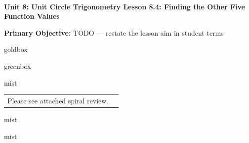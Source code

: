 \documentclass[10pt]{article}
\newcommand{\UnitNumberName}{Unit 8: Unit Circle Trigonometry \quad}
\newcommand{\LessonNumberName}{Lesson 8.4: Finding the Other Five Function Values}
\begin{document}
\begin{center}
    {\Large\bfseries \CourseName \\
    {\small\bfseries \UnitNumberName \LessonNumberName}}
\end{center}

\begin{tcolorbox}[colback=mist, colframe=royal, boxrule=0.9pt, arc=2mm,
    left=2mm, right=2mm, top=1.5mm, bottom=1.5mm]
    \textbf{Primary Objective:} TODO --- restate the lesson aim in student terms
\end{tcolorbox}

\renewcommand{\arraystretch}{1.6}
\begin{skillbox}{goldbox}
\end{skillbox}

\begin{skillbox}{greenbox}
\end{skillbox}

\begin{fixedskillbox}{mist}
    \begin{tabularx}{\linewidth}{@{}X c@{}}
        \begin{minipage}[t]{0.55\linewidth}\vspace{0pt}
            Please see attached spiral review.  %
        \end{minipage}
        &
        \begin{minipage}[t]{0.38\linewidth}\vspace{0pt}\centering
        \end{minipage}
    \end{tabularx}
\end{fixedskillbox}

\begin{skillbox}[Hook]{mist}
\end{skillbox}

\begin{skillbox}[Lesson]{mist}
\end{skillbox}
\end{document}
